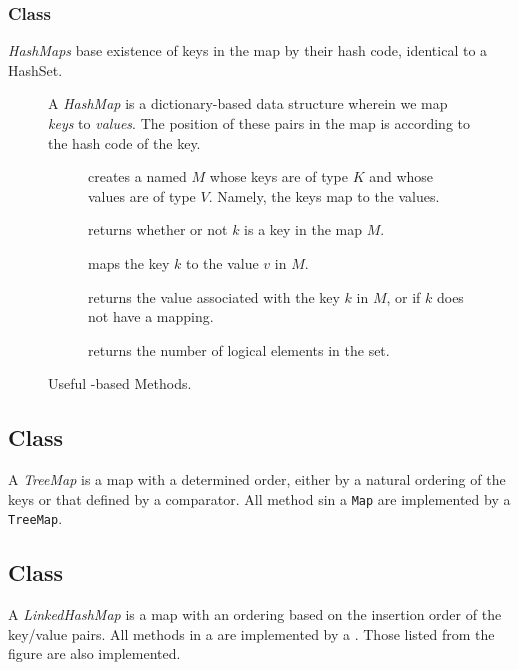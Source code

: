 \subsubsection*{ Class}
\textit{HashMaps} base existence of keys in the map by their hash code, identical to a HashSet. 
\begin{figure}[tp]
  \small
  \begin{tcolorbox}[title=Java Hash Maps]
    A \textit{HashMap} is a dictionary-based data structure wherein we map \textit{keys} to \textit{values}. The position of these pairs in the map is according to the hash code of the key.
    \vspace{2ex}
  \begin{description}
    \item [] creates a  named $M$ whose keys are of type $K$ and whose values are of type $V$. Namely, the keys map to the values.
     \item [] returns whether or not $k$ is a key in the map $M$.
     \item [] maps the key $k$ to the value $v$ in $M$.
     \item [] returns the value associated with the key $k$ in $M$, or  if $k$ does not have a mapping.
    \item [] returns the number of logical elements in the set.
  \end{description}
\end{tcolorbox}
  \caption{Useful -based Methods.}
  \label{fig:hashmap}
\end{figure}

\subsection*{ Class}
A \textit{TreeMap} is a map with a determined order, either by a natural ordering of the keys or that defined by a comparator. All method sin a \texttt{Map} are implemented by a \texttt{TreeMap}.

\subsection*{ Class}
A \textit{LinkedHashMap} is a map with an ordering based on the insertion order of the key/value pairs. All methods in a  are implemented by a . Those listed from the  figure are also implemented.

